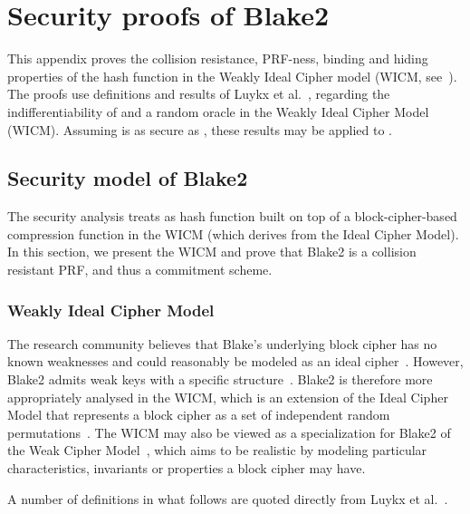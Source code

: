 
\chapter{Security proofs of Blake2}\label{appendix:blake}

This appendix proves the collision resistance, PRF-ness, binding and hiding properties of the  hash function in the Weakly Ideal Cipher model (WICM, see~\cite{luykx2016security}). The proofs use definitions and results of Luykx et al.~\cite{luykx2016security}, regarding the indifferentiability of  and a random oracle in the Weakly Ideal Cipher Model (WICM). Assuming  is as secure as , these results may be applied to .

\section{Security model of Blake2}\label{appendix:blake:secmod}

The security analysis treats  as hash function built on top of a block-cipher-based compression function in the WICM (which derives from the Ideal Cipher Model). In this section, we present the WICM and prove that Blake2 is a collision resistant PRF, and thus a commitment scheme.

\subsection{Weakly Ideal Cipher Model}\label{appendix:blake:secmod:WICM}

The research community believes that Blake’s underlying block cipher has no known weaknesses and could reasonably be modeled as an ideal cipher~\cite[Section 2.1]{luykx2016security}. However, Blake2 admits weak keys with a specific structure~\cite[Section 2.1]{luykx2016security}. Blake2 is therefore more appropriately analysed in the WICM, which is an extension of the Ideal Cipher Model that represents a block cipher as a set of independent random permutations~\cite{holenstein2011equivalence}. The WICM may also be viewed as a specialization for Blake2 of the Weak Cipher Model~\cite{mennink2015impact}, which aims to be realistic by modeling particular characteristics, invariants or properties a block cipher may have.

A number of definitions in what follows are quoted directly from Luykx et al.~\cite{luykx2016security}.

